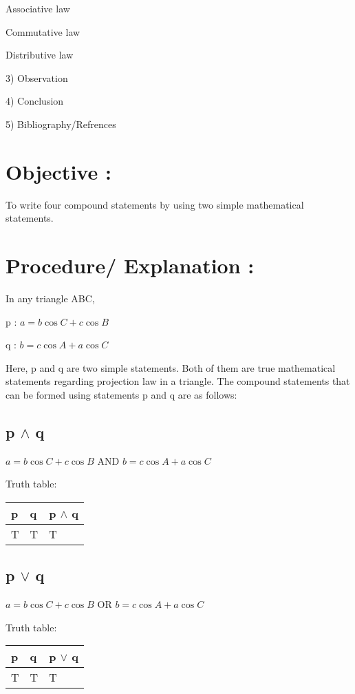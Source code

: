 \documentclass[11pt]{article}
\begin{document}
\hspace{3.8cm} Associative law


\hspace{3.8cm} Commutative law


\hspace{3.8cm} Distributive law



3) Observation


4) Conclusion


5) Bibliography/Refrences


\newpage

\section{Objective :}
 To write four compound statements by using two simple mathematical statements.
    
\section{Procedure/ Explanation :}
In any triangle ABC,


p : $a=b\cos C + c\cos B$


q : $b=c\cos A + a \cos C$


Here, p and q are two simple statements. Both of them are true mathematical statements regarding projection law in a triangle. The compound statements that can be formed using statements p and q are as follows:
\subsection{p $\wedge{}$ q}
$a=b\cos C+c \cos B$ AND $b=c \cos A+a \cos C$


Truth table:\\
\begin{center}
\begin{tabular}{ |p{2.2cm}||p{1.9cm}||p{3.3cm}|  }
 \hline
 p & q & p $\wedge$ q\\
 \hline
 T & T & T \\
 \hline
\end{tabular}
\end{center} 

\subsection{p $\vee$ q}
$a=b\cos C+c \cos B$ OR $b=c \cos A+a \cos C$


Truth table:\\
\begin{center}
\begin{tabular}{ |p{2.2cm}||p{1.9cm}||p{3.3cm}|  }
 \hline
 p & q & p $\vee$ q\\
 \hline
 T & T & T \\
 \hline
\end{tabular}
\end{center} 
\newpage
\end{document}
